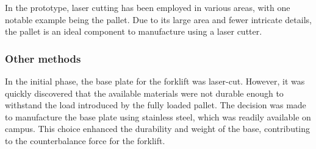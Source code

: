 \documentclass[../report.tex]{subfiles}
\begin{document}
    In the prototype, laser cutting has been employed in various areas, with
    one notable example being the pallet. Due to its large area and fewer
    intricate details, the pallet is an ideal component to manufacture using a
    laser cutter.

\subsubsection{Other methods}
    In the initial phase, the base plate for the forklift was laser-cut.
    However, it was quickly discovered that the available materials were not
    durable enough to withstand the load introduced by the fully loaded pallet.
    The decision was made to manufacture the base plate using stainless steel,
    which was readily available on campus. This choice enhanced the durability
    and weight of the base, contributing to the counterbalance force for the
    forklift.
\end{document}
